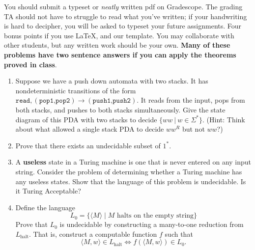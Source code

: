 \documentclass[11pt]{article}
\begin{document}

You should submit a typeset or \emph{neatly} written pdf on Gradescope.  The grading TA should not have to struggle to read what you've written; if your handwriting is hard to decipher, you will be asked to typeset your future assignments. Four bonus points if you use \LaTeX, and our template. You may collaborate with other students, but any written work should be your own. \textbf{Many of these problems have two sentence answers if you can apply the theorems proved in class}.


\begin{enumerate} 

    \item Suppose we have a push down automata with two stacks. It has nondeterministic transitions of the form $\texttt{read},(\texttt{pop1,pop2}) \rightarrow (\texttt{push1,push2})$. It reads from the input, pops from both stacks, and pushes to both stacks simultaneously. Give the state diagram of this PDA with two stacks to decide $\{ww ~|~ w \in \Sigma^*\}$. (Hint: Think about what allowed a single stack PDA to decide $ww^R$ but not $ww$?)
    \item Prove that there exists an undecidable subset of $1^*$.
    \item A \textbf{useless} state in a Turing machine is one that is never entered on any input string. Consider the problem of determining whether a Turing machine has any useless states. Show that the language of this problem is undecidable. Is it Turing Acceptable?
    \item Define the language  
    \[
    L_0 = \{ \langle M \rangle \mid M \text{ halts on the empty string} \}
    \]
    Prove that \( L_0 \) is undecidable by constructing a many-to-one reduction from \( L_{\text{halt}} \). That is, construct a computable function \( f \) such that  
    \[
    \langle M, w \rangle \in L_{\text{halt}} \iff f(\langle M, w \rangle) \in L_0.
    \]

    
\end{enumerate}
    
\end{document}
